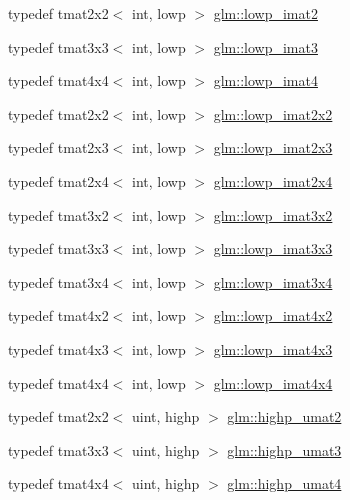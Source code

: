 \begin{DoxyCompactItemize}
typedef tmat2x2$<$ int, lowp $>$ \hyperlink{group__gtc__matrix__integer_ga4840a4d8b9e8997f1173da9e8e5e4de4}{glm\-::lowp\-\_\-imat2}
\item 
typedef tmat3x3$<$ int, lowp $>$ \hyperlink{group__gtc__matrix__integer_ga2f7d17630aa9e27bb9e62f98603a4d7e}{glm\-::lowp\-\_\-imat3}
\item 
typedef tmat4x4$<$ int, lowp $>$ \hyperlink{group__gtc__matrix__integer_gad9a60f2ee78750d31b129c01096751b6}{glm\-::lowp\-\_\-imat4}
\item 
typedef tmat2x2$<$ int, lowp $>$ \hyperlink{group__gtc__matrix__integer_gad1950bd75bc033e8511cec3deb15af56}{glm\-::lowp\-\_\-imat2x2}
\item 
typedef tmat2x3$<$ int, lowp $>$ \hyperlink{group__gtc__matrix__integer_ga00e00501dd9bf929e1dca7a167ba526b}{glm\-::lowp\-\_\-imat2x3}
\item 
typedef tmat2x4$<$ int, lowp $>$ \hyperlink{group__gtc__matrix__integer_gaf664d339f1b66e62ed07c913e60be940}{glm\-::lowp\-\_\-imat2x4}
\item 
typedef tmat3x2$<$ int, lowp $>$ \hyperlink{group__gtc__matrix__integer_ga93514d2df726334e6d5edd373635d343}{glm\-::lowp\-\_\-imat3x2}
\item 
typedef tmat3x3$<$ int, lowp $>$ \hyperlink{group__gtc__matrix__integer_ga434abdeee9a8908660691be659f6693f}{glm\-::lowp\-\_\-imat3x3}
\item 
typedef tmat3x4$<$ int, lowp $>$ \hyperlink{group__gtc__matrix__integer_ga61fe3487c1f4f10fb0f5c9fa0873a694}{glm\-::lowp\-\_\-imat3x4}
\item 
typedef tmat4x2$<$ int, lowp $>$ \hyperlink{group__gtc__matrix__integer_ga87e2118b22cbc6916805aafcda52a943}{glm\-::lowp\-\_\-imat4x2}
\item 
typedef tmat4x3$<$ int, lowp $>$ \hyperlink{group__gtc__matrix__integer_ga76c201715b216ddd5d7de3c3759211f1}{glm\-::lowp\-\_\-imat4x3}
\item 
typedef tmat4x4$<$ int, lowp $>$ \hyperlink{group__gtc__matrix__integer_ga46f8dc46c3dcde8fa2e8b8f645c0d9ef}{glm\-::lowp\-\_\-imat4x4}
\item 
typedef tmat2x2$<$ uint, highp $>$ \hyperlink{group__gtc__matrix__integer_ga113fe97aa8688eaa287a02f8362f3e47}{glm\-::highp\-\_\-umat2}
\item 
typedef tmat3x3$<$ uint, highp $>$ \hyperlink{group__gtc__matrix__integer_ga58bc8d0aeac88af0d38723b5cfa4fa67}{glm\-::highp\-\_\-umat3}
\item 
typedef tmat4x4$<$ uint, highp $>$ \hyperlink{group__gtc__matrix__integer_ga7b0e78c54432c7236d8b96473b7423ec}{glm\-::highp\-\_\-umat4}

\end{DoxyCompactItemize}
